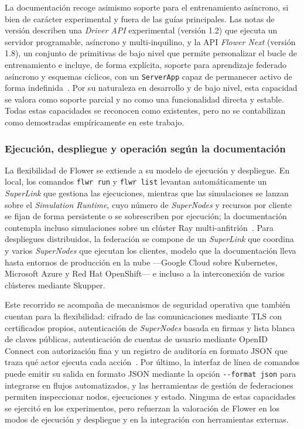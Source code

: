 La documentación recoge asimismo soporte para el entrenamiento asíncrono, si bien de
carácter experimental y fuera de las guías principales. Las notas de versión describen
una \textit{Driver API} experimental (versión 1.2) que ejecuta un servidor programable,
asíncrono y multi-inquilino, y la API \textit{Flower Next} (versión 1.8), un conjunto de
primitivas de bajo nivel que permite personalizar el bucle de entrenamiento e incluye,
de forma explícita, soporte para aprendizaje federado asíncrono y esquemas cíclicos,
con un \texttt{ServerApp} capaz de permanecer activo de forma
indefinida~\parencite{flowerDocs}. Por su naturaleza en desarrollo y de bajo
nivel, esta capacidad se valora como soporte parcial y no como una funcionalidad
directa y estable. Todas estas capacidades se reconocen como existentes, pero no se
contabilizan como demostradas empíricamente en este trabajo.

\subsubsection{Ejecución, despliegue y operación según la documentación}\label{subsec:flex-flower-deploy}

La flexibilidad de Flower se extiende a su modelo de ejecución y despliegue. En local,
los comandos \texttt{flwr run} y \texttt{flwr list} levantan automáticamente un
\textit{SuperLink} que gestiona las ejecuciones, mientras que las simulaciones se
lanzan sobre el \textit{Simulation Runtime}, cuyo número de \textit{SuperNodes} y
recursos por cliente se fijan de forma persistente o se sobrescriben por ejecución;
la documentación contempla incluso simulaciones sobre un clúster Ray
multi-anfitrión~\parencite{flowerDocs}. Para despliegues distribuidos, la
federación se compone de un \textit{SuperLink} que coordina y varios
\textit{SuperNodes} que ejecutan los clientes, modelo que la documentación lleva hasta
entornos de producción en la nube —Google Cloud sobre Kubernetes, Microsoft Azure y
Red Hat OpenShift— e incluso a la interconexión de varios clústeres mediante Skupper.

Este recorrido se acompaña de mecanismos de seguridad operativa que también cuentan
para la flexibilidad: cifrado de las comunicaciones mediante TLS con certificados
propios, autenticación de \textit{SuperNodes} basada en firmas y lista blanca de
claves públicas, autenticación de cuentas de usuario mediante OpenID Connect con
autorización fina y un registro de auditoría en formato JSON que traza qué actor
ejecuta cada acción~\parencite{flowerDocs}. Por último, la interfaz de línea de
comandos puede emitir su salida en formato JSON mediante la opción
\texttt{-{}-format json} para integrarse en flujos automatizados, y las herramientas de
gestión de federaciones permiten inspeccionar nodos, ejecuciones y estado. Ninguna de
estas capacidades se ejercitó en los experimentos, pero refuerzan la valoración de
Flower en los modos de ejecución y despliegue y en la integración con herramientas
externas.

